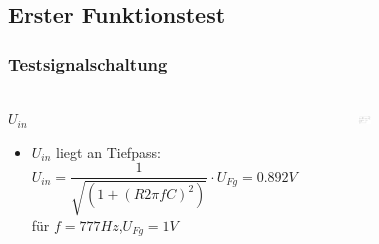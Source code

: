 \subsection{Erster Funktionstest} %
\label{sub:Erster Funktionstest}
\begin{frame}
\frametitle{Testsignalschaltung}
\framesubtitle{}
\begin{columns}[c]
         \begin{block}{$U_{in}$}
             \begin{itemize}
                \item $U_{in}$ liegt an Tiefpass:
                    \begin{equation*}
                        U_{in} = \frac{1}{\sqrt{\left(1+(R 2 \pi f
                        C)^2\right)}}\cdot U_{Fg} = 0.892V
                    \end{equation*}
                     für $f = 777Hz$,$U_{Fg} = 1V$
             \end{itemize}
         \end{block}
        \begin{figure}[H]
        \begin{center}
                \includegraphics[scale=0.3]{./img/schaltung/testsignal.png}
        \end{center}
        \end{figure}
        \begin{figure}[H]
        \begin{center}

\end{center}
\end{figure}
\end{columns}
\end{frame}
